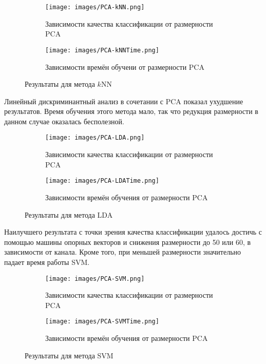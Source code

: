 \begin{figure}[h!]
    \centering
	\begin{subfigure}{0.45\textwidth}
		\texttt{[image: images/PCA-kNN.png]}
		\caption{Зависимости качества классификации от размерности PCA}
	\end{subfigure}
	\begin{subfigure}{0.45\textwidth}
		\texttt{[image: images/PCA-kNNTime.png]}
		\caption{Зависимости времён обучени от размерности PCA}
	\end{subfigure}
	\caption{Результаты для метода \(k\)NN}\label{fig:knn_pca}
\end{figure}

\par
Линейный дискриминантный анализ в сочетании с PCA показал ухудшение результатов. Время обучения этого метода мало, так что редукция размерности в данном случае оказалась бесполезной.

\begin{figure}[h!]
    \centering
	\begin{subfigure}{0.45\textwidth}
		\texttt{[image: images/PCA-LDA.png]}
		\caption{Зависимости качества классификации от размерности PCA}
	\end{subfigure}
	\begin{subfigure}{0.45\textwidth}
		\texttt{[image: images/PCA-LDATime.png]}
		\caption{Зависимости времён обучения от размерности PCA}
	\end{subfigure}
	\caption{Результаты для метода LDA}\label{fig:lda_pca}
\end{figure}

\par
Наилучшего результата с точки зрения качества классификации удалось достичь с помощью машины опорных векторов и снижения размерности до 50 или 60, в зависимости от канала. Кроме того, при меньшей размерности значительно падает время работы SVM.

\begin{figure}[h!]
    \centering
	\begin{subfigure}{0.45\textwidth}
		\texttt{[image: images/PCA-SVM.png]}
		\caption{Зависимости качества классификации от размерности PCA}
	\end{subfigure}
	\begin{subfigure}{0.45\textwidth}
		\texttt{[image: images/PCA-SVMTime.png]}
		\caption{Зависимости времён обучения от размерности PCA}
	\end{subfigure}
	\caption{Результаты для метода SVM}\label{fig:svm_pca}
\end{figure}

